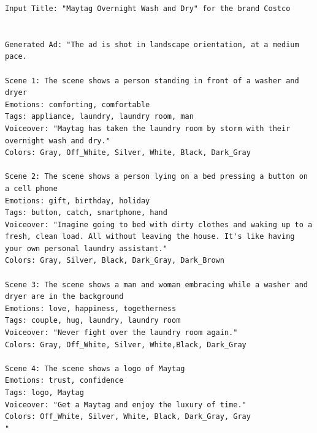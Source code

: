 \begin{lstlisting}[caption={Advertisement generated by Henry-SEED for the Costco Ad. Original Ad: \url{https://www.youtube.com/watch?v=uT72lJhUUS0}},frame=single,breaklines=true,basicstyle=\tiny, label={lst:maytag}]
Input Title: "Maytag Overnight Wash and Dry" for the brand Costco


Generated Ad: "The ad is shot in landscape orientation, at a medium pace. 

Scene 1: The scene shows a person standing in front of a washer and dryer
Emotions: comforting, comfortable
Tags: appliance, laundry, laundry room, man
Voiceover: "Maytag has taken the laundry room by storm with their overnight wash and dry."
Colors: Gray, Off_White, Silver, White, Black, Dark_Gray

Scene 2: The scene shows a person lying on a bed pressing a button on a cell phone
Emotions: gift, birthday, holiday
Tags: button, catch, smartphone, hand
Voiceover: "Imagine going to bed with dirty clothes and waking up to a fresh, clean load. All without leaving the house. It's like having your own personal laundry assistant." 
Colors: Gray, Silver, Black, Dark_Gray, Dark_Brown

Scene 3: The scene shows a man and woman embracing while a washer and dryer are in the background
Emotions: love, happiness, togetherness
Tags: couple, hug, laundry, laundry room
Voiceover: "Never fight over the laundry room again."
Colors: Gray, Off_White, Silver, White,Black, Dark_Gray

Scene 4: The scene shows a logo of Maytag
Emotions: trust, confidence
Tags: logo, Maytag
Voiceover: "Get a Maytag and enjoy the luxury of time."
Colors: Off_White, Silver, White, Black, Dark_Gray, Gray
"
\end{lstlisting}



